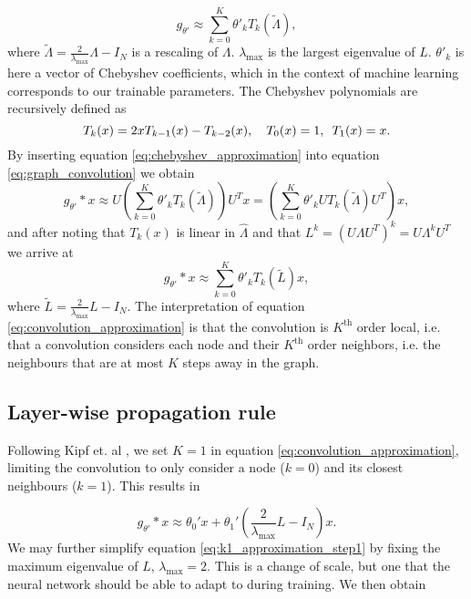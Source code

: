 \begin{equation}
    g_{\theta'} \approx \sum_{k=0}^K \theta'_k T_k(\tilde{\Lambda}),
    \label{eq:chebyshev_approximation}
\end{equation}
where $\tilde{\Lambda} = \frac{2}{\lambda_{\text{max}}}\Lambda - I_N$ is a rescaling of $\Lambda$. $\lambda_{\text{max}}$ is the largest eigenvalue of $L$. $\theta'_k$ is here a vector of Chebyshev coefficients, which in the context of machine learning corresponds to our trainable parameters. The Chebyshev polynomials are recursively defined as 
\begin{equation}
    T_k(x) = 2xT_{k-1}(x) - T_{k-2}(x), \hspace{10px} T_0(x) = 1, \hspace{5px} T_1(x) = x.
\end{equation}
By inserting equation \eqref{eq:chebyshev_approximation} into equation \eqref{eq:graph_convolution} we obtain 
\begin{equation}
    g_{\theta'} * x \approx U \left(\sum_{k=0}^K \theta'_k T_k(\tilde{\Lambda})\right)U^Tx = \left(\sum_{k=0}^K \theta'_k U T_k(\tilde{\Lambda}) U^T\right)x,
\end{equation}
and after noting that $T_k(x)$ is linear in $\hat{\Lambda}$ and that $L^k = \left( U \Lambda U^T \right)^k = U \Lambda^k U^T$ we arrive at 
\begin{equation}
    g_{\theta'} * x \approx \sum_{k=0}^K \theta'_k T_k(\tilde{L})x,
    \label{eq:convolution_approximation}
\end{equation}
where $\tilde{L} =  \frac{2}{\lambda_{\text{max}}}L - I_N$. The interpretation of equation \eqref{eq:convolution_approximation} is that the convolution is $K^{\text{th}}$ order local, i.e. that a convolution considers each node and their $K^{\text{th}}$ order neighbors, i.e. the neighbours that are at most $K$ steps away in the graph. 


\subsection{Layer-wise propagation rule}

Following Kipf et. al \cite{kipf_semi_supervised}, we set $K=1$ in equation \eqref{eq:convolution_approximation}, limiting the convolution to only consider a node ($k=0$) and its closest neighbours ($k=1$). This results in 

\begin{equation}
    g_{\theta'} * x \approx \theta_0' x + \theta_1' \left( \frac{2}{\lambda_{\text{max}}}L - I_N \right)x.
    \label{eq:k1_approximation_step1}
\end{equation}
We may further simplify equation \eqref{eq:k1_approximation_step1} by fixing the maximum eigenvalue of $L$, $\lambda_{\text{max}} = 2$. This is a change of scale, but one that the neural network should be able to adapt to during training. We then obtain

